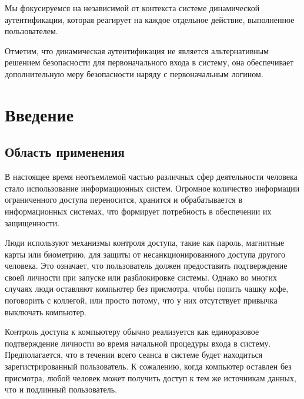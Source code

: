 \documentclass[12pt]{article}
\begin{document}
    \par Мы фокусируемся на независимой от контекста системе динамической аутентификации, которая реагирует на каждое отдельное действие, выполненное пользователем. \\

    \par Отметим, что динамическая аутентификация не является альтернативным решением безопасности для первоначального входа в систему, она обеспечивает дополнительную меру безопасности наряду с первоначальным логином.

    \newpage



    \section{Введение}
    \label{sec:Intro}

    \subsection{Область применения}
    \label{sec:Intro:ApplicationArea}

    \par В настоящее время неотъемлемой частью различных сфер деятельности человека стало использование информационных систем. Огромное количество информации ограниченного доступа переносится, хранится и обрабатывается в информационных системах, что формирует потребность в обеспечении их защищенности. \\

    \par Люди используют механизмы контроля доступа, такие как пароль, магнитные карты или биометрию, для защиты от несанкционированного доступа другого человека. Это означает, что пользователь должен предоставить подтверждение своей личности при запуске или разблокировке системы. Однако во многих случаях люди оставляют компьютер без присмотра, чтобы попить чашку кофе, поговорить с коллегой, или просто потому, что у них отсутствует привычка выключать компьютер. \\

    \par Контроль доступа к компьютеру обычно реализуется как единоразовое подтверждение личности во время начальной процедуры входа в систему. Предполагается, что в течении всего сеанса в системе будет находиться зарегистрированный пользователь. К сожалению, когда компьютер оставлен без присмотра, любой человек может получить доступ к тем же источникам данных, что и подлинный пользователь. \\
\end{document}
